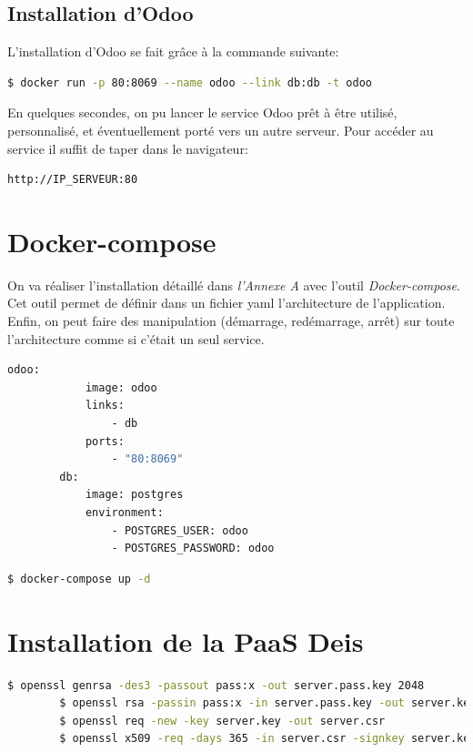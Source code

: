 \section*{Installation d'Odoo}

	L'installation d'Odoo se fait grâce à la commande suivante:
	\begin{lstlisting}[language=bash,caption=Installation d'Odoo]
		$ docker run -p 80:8069 --name odoo --link db:db -t odoo
	\end{lstlisting}

	En quelques secondes, on pu lancer le service Odoo prêt à être utilisé, personnalisé, et éventuellement porté vers un autre serveur. Pour accéder au service il suffit de taper dans le navigateur:

	\begin{lstlisting}[language=bash]
		http://IP_SERVEUR:80
	\end{lstlisting}

	




\chapter{Docker-compose}

	On va réaliser l'installation détaillé dans \emph{l'Annexe A} avec l'outil \emph{Docker-compose}. Cet outil permet de définir dans un fichier \acrshort{yaml} l'architecture de l'application. Enfin, on peut faire des manipulation (démarrage, redémarrage, arrêt) sur toute l'architecture comme si c'était un seul service.

	\begin{lstlisting}[language=bash,caption=Installation d'Odoo avec Docker-compose]
		odoo:
	  		image: odoo
		  	links:
		   		- db
		  	ports:
		   		- "80:8069"
		db:
		  	image: postgres
		  	environment:
  				- POSTGRES_USER: odoo
  				- POSTGRES_PASSWORD: odoo
	\end{lstlisting}

	\begin{lstlisting}[language=bash,caption=Lancement d'Odoo avec Docker-compose]
		$ docker-compose up -d
	\end{lstlisting}


\chapter{Installation de la PaaS Deis}

	\begin{lstlisting}[language=bash,caption=Génération de la clé privée eet la certificat]
		$ openssl genrsa -des3 -passout pass:x -out server.pass.key 2048
		$ openssl rsa -passin pass:x -in server.pass.key -out server.key
		$ openssl req -new -key server.key -out server.csr
		$ openssl x509 -req -days 365 -in server.csr -signkey server.key -out server.crt
	\end{lstlisting}

